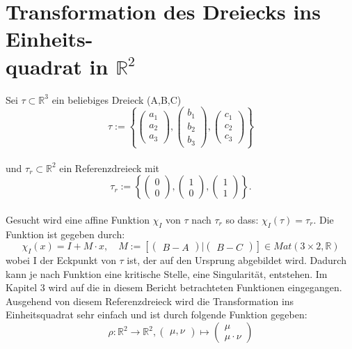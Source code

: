 \documentclass[12pt]{article}
\newcommand{\R}{\mathbb{R}}
\begin{document}
\section[Transformation des Dreiecks ins Einheitsquadrat in $\R^2$]{Transformation des Dreiecks ins Einheits-\\quadrat in $\R^2$}
Sei $\tau\subset\R^3$ ein beliebiges Dreieck (A,B,C)
\[
\tau := \left \{
\begin{pmatrix} a_1\\ a_2 \\ a_3 \end{pmatrix}
,
\begin{pmatrix} b_1\\ b_2 \\ b_3 \end{pmatrix}
,
\begin{pmatrix} c_1\\ c_2 \\ c_3 \end{pmatrix}
\right \}
\]
\\
und $\tau_r\subset\R^2$ ein Referenzdreieck mit
\[
 \tau_r := \left \{
\begin{pmatrix} 0\\ 0 \end{pmatrix}
,
\begin{pmatrix} 1\\ 0\end{pmatrix}
,
\begin{pmatrix} 1\\ 1\end{pmatrix}
\right \} .
\]
\\
Gesucht wird eine affine Funktion $\chi_I$ von $\tau$ nach $\tau_r$ so dass: $\chi_I(\tau) = \tau_r$. Die Funktion ist gegeben durch:
\[
\chi_I(x) = I + M\cdot x, \quad M := \left[
\begin{pmatrix} B-A \end{pmatrix}
|
\begin{pmatrix} B-C \end{pmatrix}
\right]
 \in Mat(3\times 2,\R)
\]
wobei I der Eckpunkt von $\tau$ ist, der auf den Ursprung abgebildet wird. Dadurch kann je nach Funktion eine kritische Stelle, eine Singularität, entstehen. Im Kapitel 3 wird auf die in diesem Bericht betrachteten Funktionen eingegangen.
\\
Ausgehend von diesem Referenzdreieck wird die Transformation ins Einheitsquadrat sehr einfach und ist durch folgende Funktion gegeben:
\[
\rho : \R^2 \rightarrow \R^2, \begin{pmatrix} \mu,\nu \end{pmatrix} \mapsto \begin{pmatrix} \mu\\\mu\cdot\nu \end{pmatrix}
\]
\\
\end{document}
